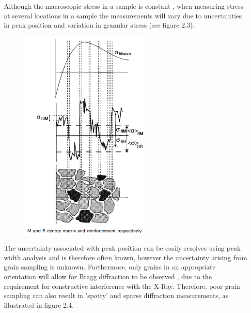 Although the macroscopic stress in a sample is constant \cite{withers_2001_residual}, when measuring stress at several locations in a sample the measurements will vary due to uncertainties in peak position and variation in granular stress (see figure 2.3). 

 \begin{figure}[H]
 	\centering
 	\includegraphics[width=0.6\textwidth]{chapters/chapter01/fig01/grainsamplingstatistics.png}
    \label{fig:RHP02}
 \end{figure}

The uncertainty associated with peak position can be easily resolves using peak width analysis \cite{luo_2017_uncertainty} and is therefore often known, however the uncertainty arising from grain sampling is unknown. Furthermore, only grains in an appropriate orientation will allow for Bragg diffraction to be observed \cite{bramble_2014_grain}, due to the requirement for constructive interference with the X-Ray. Therefore, poor grain sampling can also result in 'spotty' and sparse diffraction measurements, as illustrated in figure 2.4. 

